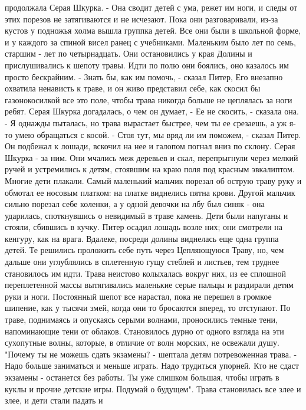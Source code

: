 продолжала Серая Шкурка. - Она сводит детей с ума, режет им ноги, и 
следы от этих порезов не затягиваются и не исчезают.
    Пока они разговаривали, из-за кустов у подножья холма вышла 
группка детей. Все они были в школьной форме, и у каждого за спиной 
висел ранец с учебниками. Маленьким было лет по семь, старшим - лет по 
четырнадцать. Они остановились у края Долины и прислушивались к шепоту 
травы. Идти по полю они боялись, оно казалось им просто бескрайним.
    - Знать бы, как им помочь, - сказал Питер, Его внезапно охватила 
ненависть к траве, и он живо представил себе, как скосил бы 
газонокосилкой все это поле, чтобы трава никогда больше не цеплялась 
за ноги ребят.
    Серая Шкурка догадалась, о чем он думает,
    - Ее не скосить, - сказала она. - Я однажды пыталась, но трава 
вырастает быстрее, чем ты ее срезаешь, а уж я-то умею обращаться с 
косой.
    - Стоя тут, мы вряд ли им поможем, - сказал Питер.
    Он подбежал к лошади, вскочил на нее и галопом погнал вниз по 
склону. Серая Шкурка - за ним. Они мчались меж деревьев и скал, 
перепрыгнули через мелкий ручей и устремились к детям, стоявшим на 
краю поля под красным эвкалиптом. Многие дети плакали. Самый маленький 
мальчик порезал об острую траву руку и обмотал ее носовым платком: на 
платке виднелись пятна крови. Другой мальчик сильно порезал себе 
коленки, а у одной девочки на лбу был синяк - она ударилась, 
споткнувшись о невидимый в траве камень. Дети были напуганы и стояли, 
сбившись в кучку. Питер осадил лошадь возле них; они смотрели на 
кенгуру, как на врага.
    Вдалеке, посреди долины виднелась еще одна группа детей. Те 
решились проложить себе путь через Цепляющуюся Траву, но, чем дальше 
они углублялись в сплетенную гущу стеблей и листьев, тем труднее 
становилось им идти. Трава неистово колыхалась вокруг них, из ее 
сплошной переплетенной массы вытягивались маленькие серые пальцы и 
раздирали детям руки и ноги. Постоянный шепот все нарастал, пока не 
перешел в громкое шипение, как у тысячи змей, когда они то бросаются 
вперед, то отступают.
    По траве, поднимаясь и опускаясь серыми волнами, проносились 
темные тени, напоминающие тени от облаков. Становилось дурно от одного 
взгляда на эти сухопутные волны, которые, в отличие от волн морских, 
не освежали душу.
    "Почему ты не можешь сдать экзамены? - шептала детям потревоженная 
трава. - Надо больше заниматься и меньше играть. Надо трудиться 
упорней. Кто не сдаст экзамены - останется без работы. Ты уже слишком 
большая, чтобы играть в куклы и прочие детские игры. Подумай о 
будущем".
    Трава становилась все злее и злее, и дети стали падать и 
